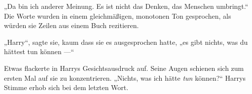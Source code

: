 „Da bin ich anderer Meinung. Es ist nicht das Denken, das Menschen umbringt.“ Die Worte wurden in einem gleichmäßigen, monotonen Ton gesprochen, als würden sie Zeilen aus einem Buch rezitieren.

„Harry“, sagte sie, kaum dass sie es ausgesprochen hatte, „es gibt nichts, was du hättest tun können —“


Etwas flackerte in Harrys Gesichtsausdruck auf. Seine Augen schienen sich zum ersten Mal auf sie zu konzentrieren.
„Nichts, was ich hätte \emph{tun} können?“ Harrys Stimme erhob sich bei dem letzten Wort.
